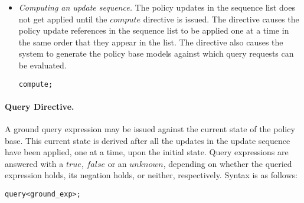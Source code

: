 \documentclass[glov2,twocolumn,final]{svjour2}
\newenvironment{vverbatim}
  {\begin{alltt}}
  {\vspace{-\baselineskip}\end{alltt}}
\begin{document}
\begin{itemize}
          \item
            {\em Computing an update sequence.}
            The policy updates in the sequence list does not get applied until
            the $compute$ directive is issued. The directive causes the policy
            update references in the sequence list to be applied one at a time
            in the same order that they appear in the list. The directive also
            causes the system to generate the policy base models against which
            query requests can be evaluated.

            \begin{vverbatim}
  compute;
            \end{vverbatim}
        \end{itemize}

        \paragraph{Query Directive.}

          A ground query expression may be issued against the current state of
          the policy base. This current state is derived after all the updates
          in the update sequence have been applied, one at a time, upon the
          initial state. Query expressions are answered with a $true$, $false$
          or an $unknown$, depending on whether the queried expression holds,
          its negation holds, or neither, respectively. Syntax is as follows:

          \begin{vverbatim}
  query <ground\_exp>;
          \end{vverbatim}
\end{document}
